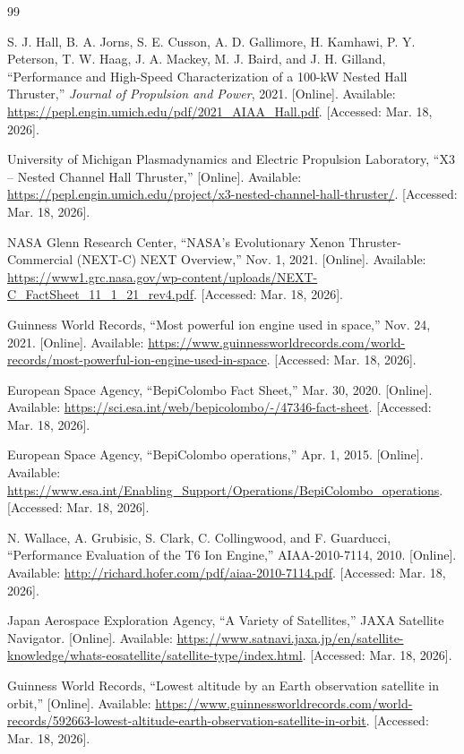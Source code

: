 \documentclass[11pt]{article}
\begin{document}
\begin{thebibliography}{99}

S. J. Hall, B. A. Jorns, S. E. Cusson, A. D. Gallimore, H. Kamhawi, P. Y. Peterson, T. W. Haag, J. A. Mackey, M. J. Baird, and J. H. Gilland, ``Performance and High-Speed Characterization of a 100-kW Nested Hall Thruster,'' \emph{Journal of Propulsion and Power}, 2021. [Online]. Available: \url{https://pepl.engin.umich.edu/pdf/2021_AIAA_Hall.pdf}. [Accessed: Mar. 18, 2026].

University of Michigan Plasmadynamics and Electric Propulsion Laboratory, ``X3 -- Nested Channel Hall Thruster,'' [Online]. Available: \url{https://pepl.engin.umich.edu/project/x3-nested-channel-hall-thruster/}. [Accessed: Mar. 18, 2026].

NASA Glenn Research Center, ``NASA's Evolutionary Xenon Thruster-Commercial (NEXT-C) NEXT Overview,'' Nov. 1, 2021. [Online]. Available: \url{https://www1.grc.nasa.gov/wp-content/uploads/NEXT-C_FactSheet_11_1_21_rev4.pdf}. [Accessed: Mar. 18, 2026].

Guinness World Records, ``Most powerful ion engine used in space,'' Nov. 24, 2021. [Online]. Available: \url{https://www.guinnessworldrecords.com/world-records/most-powerful-ion-engine-used-in-space}. [Accessed: Mar. 18, 2026].

European Space Agency, ``BepiColombo Fact Sheet,'' Mar. 30, 2020. [Online]. Available: \url{https://sci.esa.int/web/bepicolombo/-/47346-fact-sheet}. [Accessed: Mar. 18, 2026].

European Space Agency, ``BepiColombo operations,'' Apr. 1, 2015. [Online]. Available: \url{https://www.esa.int/Enabling_Support/Operations/BepiColombo_operations}. [Accessed: Mar. 18, 2026].

N. Wallace, A. Grubisic, S. Clark, C. Collingwood, and F. Guarducci, ``Performance Evaluation of the T6 Ion Engine,'' AIAA-2010-7114, 2010. [Online]. Available: \url{http://richard.hofer.com/pdf/aiaa-2010-7114.pdf}. [Accessed: Mar. 18, 2026].

Japan Aerospace Exploration Agency, ``A Variety of Satellites,'' JAXA Satellite Navigator. [Online]. Available: \url{https://www.satnavi.jaxa.jp/en/satellite-knowledge/whats-eosatellite/satellite-type/index.html}. [Accessed: Mar. 18, 2026].

Guinness World Records, ``Lowest altitude by an Earth observation satellite in orbit,'' [Online]. Available: \url{https://www.guinnessworldrecords.com/world-records/592663-lowest-altitude-earth-observation-satellite-in-orbit}. [Accessed: Mar. 18, 2026].


\end{thebibliography}
\end{document}
